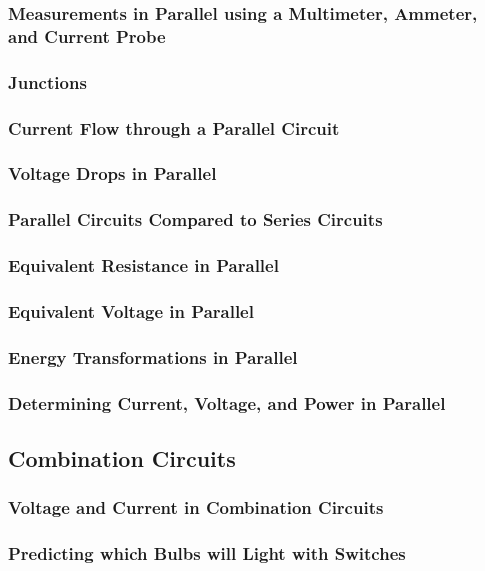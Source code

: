 \documentclass[../main-physics-problems.tex]{subfiles}
\begin{document}
\subsubsection{Measurements in Parallel using a Multimeter, Ammeter, and Current Probe}
\subsubsection{Junctions}
\subsubsection{Current Flow through a Parallel Circuit}
\subsubsection{Voltage Drops in Parallel}
\subsubsection{Parallel Circuits Compared to Series Circuits}
\subsubsection{Equivalent Resistance in Parallel}
\subsubsection{Equivalent Voltage in Parallel}
\subsubsection{Energy Transformations in Parallel}
\subsubsection{Determining Current, Voltage, and Power in Parallel}

\clearpage

\subsection{Combination Circuits}
\subsubsection{Voltage and Current in Combination Circuits}
\subsubsection{Predicting which Bulbs will Light with Switches}
\end{document}
